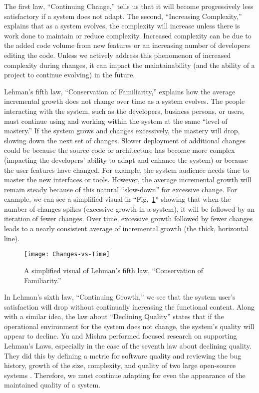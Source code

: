 The first law, ``Continuing Change,'' tells us that it will become progressively less satisfactory if a system does not adapt. The second, ``Increasing Complexity,'' explains that as a system evolves, the complexity will increase unless there is work done to maintain or reduce complexity. Increased complexity can be due to the added code volume from new features or an increasing number of developers editing the code. Unless we actively address this phenomenon of increased complexity during changes, it can impact the maintainability (and the ability of a project to continue evolving) in the future.

Lehman's fifth law, ``Conservation of Familiarity,'' explains how the average incremental growth does not change over time as a system evolves. The people interacting with the system, such as the developers, business persons, or users, must continue using and working within the system at the same ``level of mastery.'' If the system grows and changes excessively, the mastery will drop, slowing down the next set of changes. Slower deployment of additional changes could be because the source code or architecture has become more complex (impacting the developers' ability to adapt and enhance the system) or because the user features have changed. For example, the system audience needs time to master the new interfaces or tools. However, the average incremental growth will remain steady because of this natural ``slow-down'' for excessive change. For example, we can see a simplified visual in ``Fig.~\ref{figConservationOfFamiliarity}'' showing that when the number of changes spikes (excessive growth in a system), it will be followed by an iteration of fewer changes. Over time, excessive growth followed by fewer changes leads to a nearly consistent average of incremental growth (the thick, horizontal line).

\begin{figure}[ht]
    \centerline{
        \texttt{[image: Changes-vs-Time]}
    }
    \caption{A simplified visual of Lehman's fifth law, ``Conservation of Familiarity.''}
    \label{figConservationOfFamiliarity}
\end{figure}

In Lehman's sixth law, ``Continuing Growth,'' we see that the system user's satisfaction will drop without continually increasing the functional content. Along with a similar idea, the law about ``Declining Quality'' states that if the operational environment for the system does not change, the system's quality will appear to decline. Yu and Mishra performed focused research on supporting Lehman's Laws, especially in the case of the seventh law about declining quality. They did this by defining a metric for software quality and reviewing the bug history, growth of the size, complexity, and quality of two large open-source systems \cite{yu:2013}. Therefore, we must continue adapting for even the appearance of the maintained quality of a system.

